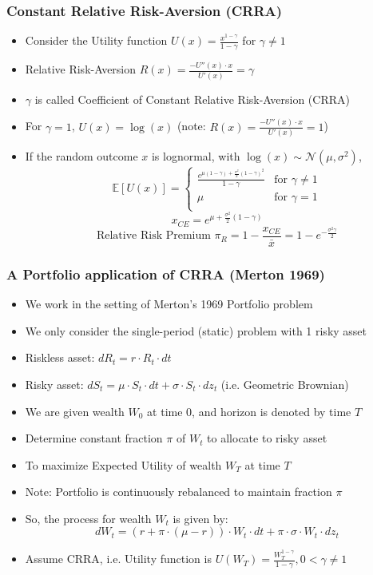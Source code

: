 \documentclass[handout]{beamer}
\begin{document}
\begin{frame}
\frametitle{Constant Relative Risk-Aversion (CRRA)}
\pause
\begin{itemize}[<+->]
\item Consider the Utility function $U(x) = \frac {x^{1 - \gamma}} {1 - \gamma}$ for $\gamma \neq 1$
\item Relative Risk-Aversion $R(x) = \frac {-U''(x) \cdot x} {U'(x)} = \gamma$
\item $\gamma$ is called Coefficient of Constant Relative Risk-Aversion (CRRA)
\item For $\gamma = 1$, $U(x) = \log(x)$ (note: $R(x) = \frac {-U''(x) \cdot x} {U'(x)} = 1$)
\item If the random outcome $x$ is lognormal, with $\log(x) \sim \mathcal{N}(\mu, \sigma^2)$,
$$
\mathbb{E}[U(x)] = 
\begin{cases}
\frac {e^{\mu (1 - \gamma) + \frac {\sigma^2} 2 (1-\gamma)^2}} {1 - \gamma} & \text{for } \gamma \neq 1\\
\mu & \text {for } \gamma = 1\\
\end{cases}
$$
$$x_{CE} = e^{\mu + \frac {\sigma^2} 2 (1- \gamma)}$$
$$\mbox{Relative Risk Premium } \pi_R = 1 - \frac {x_{CE}} {\bar{x}} =  1 - e^{-\frac {\sigma^2 \gamma} 2}$$
\end{itemize}
\end{frame}

\begin{frame}
\frametitle{A Portfolio application of CRRA (Merton 1969)}
\pause
\begin{itemize}[<+->]
\item We work in the setting of Merton's 1969 Portfolio problem
\item We only consider the single-period (static) problem with 1 risky asset
\item Riskless asset: $dR_t = r \cdot R_t \cdot dt$
\item Risky asset: $dS_t = \mu \cdot S_t \cdot dt + \sigma \cdot S_t \cdot dz_t$ (i.e. Geometric Brownian)
\item We are given wealth $W_0$ at time 0, and horizon is denoted by time $T$
\item Determine constant fraction $\pi$ of $W_t$ to allocate to risky asset
\item To maximize Expected Utility of wealth $W_T$ at time $T$
\item Note: Portfolio is continuously rebalanced to maintain fraction $\pi$
\item So, the process for wealth $W_t$ is given by:
$$dW_t = (r + \pi \cdot (\mu - r)) \cdot W_t \cdot dt + \pi \cdot \sigma \cdot W_t \cdot dz_t$$
\item Assume CRRA, i.e. Utility function is $U(W_T) = \frac {W_T^{1-\gamma}} {1-\gamma}, 0 < \gamma \neq 1$
\end{itemize}
\end{frame}
\end{document}
